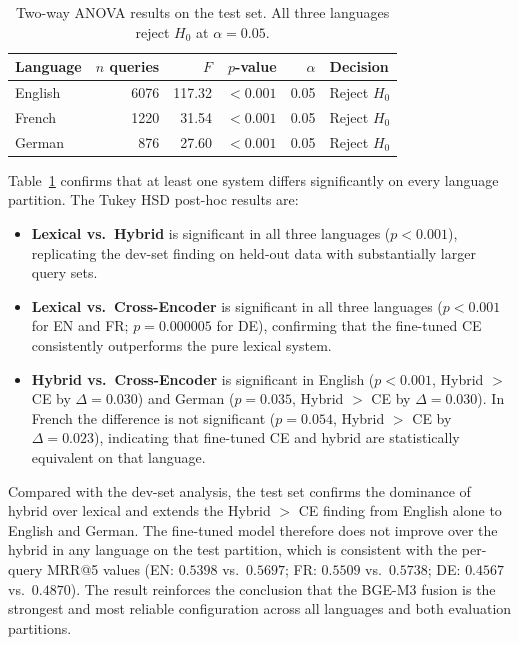 \begin{table}[!ht]
  \caption{Two-way ANOVA results on the test set. All three languages reject $H_0$ at $\alpha = 0.05$.}
  \label{tab:anova-test}
  \centering
  \begin{tabular}{lrrrrl}
    \toprule
    Language & $n$ queries & $F$ & $p$-value & $\alpha$ & Decision \\
    \midrule
    English & 6076 & 117.32 & $<0.001$ & 0.05 & Reject $H_0$ \\
    French  & 1220 &  31.54 & $<0.001$ & 0.05 & Reject $H_0$ \\
    German  &  876 &  27.60 & $<0.001$ & 0.05 & Reject $H_0$ \\
    \bottomrule
  \end{tabular}
\end{table}

Table~\ref{tab:anova-test} confirms that at least one system differs significantly on every language partition. The Tukey HSD post-hoc results are:

\begin{itemize}
  \item \textbf{Lexical vs.\ Hybrid} is significant in all three languages ($p < 0.001$), replicating the dev-set finding on held-out data with substantially larger query sets.
  \item \textbf{Lexical vs.\ Cross-Encoder} is significant in all three languages ($p < 0.001$ for EN and FR; $p = 0.000005$ for DE), confirming that the fine-tuned CE consistently outperforms the pure lexical system.
  \item \textbf{Hybrid vs.\ Cross-Encoder} is significant in English ($p < 0.001$, Hybrid $>$ CE by $\Delta{=}0.030$) and German ($p = 0.035$, Hybrid $>$ CE by $\Delta{=}0.030$). In French the difference is not significant ($p = 0.054$, Hybrid $>$ CE by $\Delta{=}0.023$), indicating that fine-tuned CE and hybrid are statistically equivalent on that language.
\end{itemize}

Compared with the dev-set analysis, the test set confirms the dominance of hybrid over lexical and extends the Hybrid $>$ CE finding from English alone to English and German. The fine-tuned model therefore does not improve over the hybrid in any language on the test partition, which is consistent with the per-query MRR@5 values (EN: $0.5398$ vs.\ $0.5697$; FR: $0.5509$ vs.\ $0.5738$; DE: $0.4567$ vs.\ $0.4870$). The result reinforces the conclusion that the BGE-M3 fusion is the strongest and most reliable configuration across all languages and both evaluation partitions.

